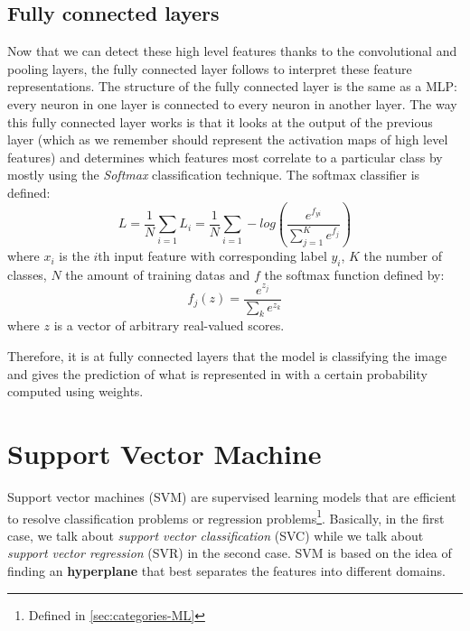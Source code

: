 \documentclass[11pt, openany]{report}
\theoremstyle{plain}
\theoremstyle{definition}
\theoremstyle{remark}
\begin{document}
\newpage
\subsection{Fully connected layers} \label{sec:fully-connected-layer}
Now that we can detect these high level features thanks to the convolutional and pooling layers, the fully connected layer follows to interpret these feature representations. The structure of the fully connected layer is the same as a MLP: every neuron in one layer is connected to every neuron in another layer. The way this fully connected layer works is that it looks at the output of the previous layer (which as we remember should represent the activation maps of high level features) and determines which features most correlate to a particular class by mostly using the \textit{Softmax} classification technique.
The softmax classifier is defined: 
$$ L = \frac{1}{N} \sum_{i=1} L_{i} =  \frac{1}{N} \sum_{i = 1} - log \left(  \frac{e^{f_{yi}}}{\sum_{j=1}^K e^{f_{j}}}  \right) $$ 
where $x_{i}$ is the $i$th input feature with corresponding label $y_{i}$, $K$ the number of classes, $N$ the amount of training datas and $f$ the softmax function defined by: 
$$ f_{j}(z) = \frac{e^{z_{j}}}{\sum_{k} e^{z_{k}}} $$ where $z$ is a vector of arbitrary real-valued scores. 

Therefore, it is at fully connected layers that the model is classifying the image and gives the prediction of what is represented in with a certain probability computed using weights.






\newpage
\section{Support Vector Machine} \label{sec:svm}
Support vector machines (SVM) are supervised learning models that are efficient to resolve classification problems or regression problems\footnote{Defined in \autoref{sec:categories-ML}}. Basically, in the first case, we talk about \textit{support vector classification} (SVC) while we talk about \textit{support vector regression} (SVR) in the second case. SVM is based on the idea of finding an \textbf{hyperplane} that best separates the features into different domains. 
\end{document}
